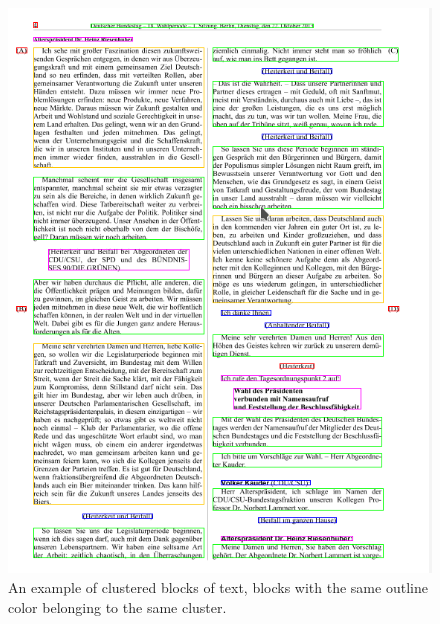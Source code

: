 \begin{figure}[htb]
  \centering
  \includegraphics[height=0.5\textheight]{figures/cluster_example.png}
  \caption{An example of clustered blocks of text, blocks with the same outline
    color belonging to the same cluster.}
  \label{fig:clustered}
\end{figure}

